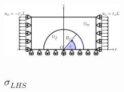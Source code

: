 \documentclass[first,firstsupp,lastsupp,last,hyperref,table]{ETHclass}
\begin{document}
\begin{frame}
\begin{columns}[c]
\begin{column}{0.5\textwidth}
\begin{figure}
\end{figure}
\end{column}
\end{columns}
\vspace{-0.25cm}
\includegraphics[width=0.45\textwidth]{refAngle.pdf}
\end{frame}

\subsection{$\sigma_{LHS}$}
\end{document}
